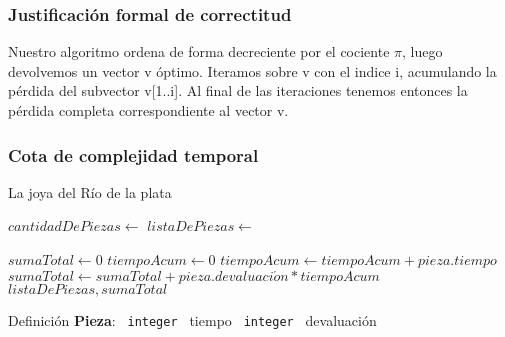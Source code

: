 \documentclass[11pt, a4paper, twoside]{article}
\begin{document}
\subsubsection{Justificación formal de correctitud}
Nuestro algoritmo ordena de forma decreciente por el cociente $\pi$, luego devolvemos un vector v óptimo. Iteramos sobre v con el indice i, acumulando la pérdida del subvector v[1..i]. Al final de las iteraciones tenemos entonces la pérdida completa correspondiente al vector v.

\newpage

\subsubsection{Cota de complejidad temporal}

\begin{algorithm}
\caption{La joya del Río de la plata}\label{logpascual}
\footnotesize\begin{algorithmic}[1]
	\Require
		\Statex $cantidadDePiezas \gets$  
		\Statex $listaDePiezas \gets$  
	\Ensure
		\Statex {} 
	\Statex
	
  \State $sumaTotal \gets 0$ 
  \State $tiempoAcum \gets 0$ 
  \State {} 
   
    \State $tiempoAcum \gets tiempoAcum + pieza.tiempo$ 
    \State $sumaTotal \gets sumaTotal + pieza.devaluaci\acute{o}n * tiempoAcum $ 
    \EndFor {}
  \State \Return $listaDePiezas, sumaTotal$
  \State

  \Statex{}
   
   
    \State {} 
  \Else
    \State {}
  \EndIf
	\EndFunction {}
  \State

  \Statex
  \State Definición \textbf{Pieza}:
  \State \texttt{ integer } tiempo 
  \State \texttt{ integer } devaluación 
	\Statex{}
	
\end{algorithmic}
\end{algorithm}
\end{document}
